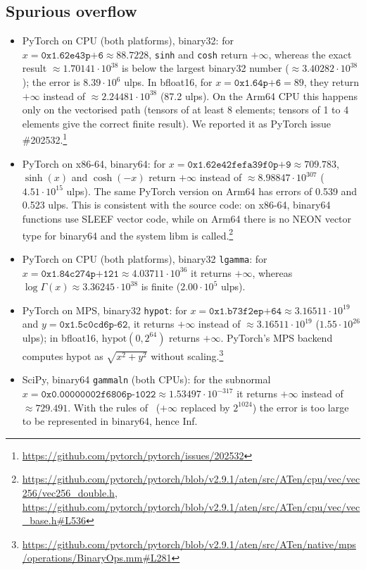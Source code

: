 \documentclass[11pt,a4paper]{article}
\begin{document}
\subsection{Spurious overflow}
\begin{itemize}
\item PyTorch on CPU (both platforms), binary32: for $x=\texttt{0x1.62e43p+6}\approx 88.7228$, \texttt{sinh} and \texttt{cosh} return $+\infty$, whereas the exact result $\approx 1.70141\cdot10^{38}$ is below the largest binary32 number ($\approx 3.40282\cdot10^{38}$); the error is $8.39\cdot10^6$ ulps. In bfloat16, for $x=\texttt{0x1.64p+6}=89$, they return $+\infty$ instead of $\approx 2.24481\cdot10^{38}$ (87.2 ulps). On the Arm64 CPU this happens only on the vectorised path (tensors of at least 8 elements; tensors of 1 to 4 elements give the correct finite result). We reported it as PyTorch issue \#202532.\footnote{\url{https://github.com/pytorch/pytorch/issues/202532}}
\item PyTorch on x86-64, binary64: for $x=\texttt{0x1.62e42fefa39f0p+9}\approx 709.783$, $\sinh(x)$ and $\cosh(-x)$ return $+\infty$ instead of $\approx 8.98847\cdot10^{307}$ ($4.51\cdot10^{15}$ ulps). The same PyTorch version on Arm64 has errors of 0.539 and 0.523 ulps. This is consistent with the source code: on x86-64, binary64 functions use SLEEF vector code, while on Arm64 there is no NEON vector type for binary64 and the system libm is called.\footnote{\url{https://github.com/pytorch/pytorch/blob/v2.9.1/aten/src/ATen/cpu/vec/vec256/vec256_double.h}, \url{https://github.com/pytorch/pytorch/blob/v2.9.1/aten/src/ATen/cpu/vec/vec_base.h\#L536}}
\item PyTorch on CPU (both platforms), binary32 \texttt{lgamma}: for $x=\texttt{0x1.84c274p+121}\approx 4.03711\cdot10^{36}$ it returns $+\infty$, whereas $\log\Gamma(x)\approx 3.36245\cdot10^{38}$ is finite ($2.00\cdot10^5$ ulps).
\item PyTorch on MPS, binary32 \texttt{hypot}: for $x=\texttt{0x1.b73f2ep+64}\approx 3.16511\cdot10^{19}$ and $y=\texttt{0x1.5c0cd6p-62}$, it returns $+\infty$ instead of $\approx 3.16511\cdot10^{19}$ ($1.55\cdot10^{26}$ ulps); in bfloat16, $\mathrm{hypot}(0,2^{64})$ returns $+\infty$. PyTorch's MPS backend computes hypot as $\sqrt{x^2+y^2}$ without scaling.\footnote{\url{https://github.com/pytorch/pytorch/blob/v2.9.1/aten/src/ATen/native/mps/operations/BinaryOps.mm\#L281}}
\item SciPy, binary64 \texttt{gammaln} (both CPUs): for the subnormal $x=\texttt{0x0.00000002f6806p-1022}\approx 1.53497\cdot10^{-317}$ it returns $+\infty$ instead of $\approx 729.491$. With the rules of~\cite{GIMOZ2026} ($+\infty$ replaced by $2^{1024}$) the error is too large to be represented in binary64, hence Inf.
\end{itemize}
\end{document}
